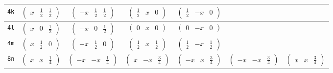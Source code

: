 \documentclass[fleqn,9pt,landscape]{jsarticle}
\begin{document}
\begin{center}
\begin{longtable}{ccccccc}
{\tt 4k} & $ \begin{pmatrix} x & \frac{1}{2} & \frac{1}{2} \end{pmatrix} $ & $ \begin{pmatrix} - x & \frac{1}{2} & \frac{1}{2} \end{pmatrix} $ & $ \begin{pmatrix} \frac{1}{2} & x & 0 \end{pmatrix} $ & $ \begin{pmatrix} \frac{1}{2} & - x & 0 \end{pmatrix} $ & $  $ & $  $ \\ \hline
{\tt 4l} & $ \begin{pmatrix} x & 0 & \frac{1}{2} \end{pmatrix} $ & $ \begin{pmatrix} - x & 0 & \frac{1}{2} \end{pmatrix} $ & $ \begin{pmatrix} 0 & x & 0 \end{pmatrix} $ & $ \begin{pmatrix} 0 & - x & 0 \end{pmatrix} $ & $  $ & $  $ \\ \hline
{\tt 4m} & $ \begin{pmatrix} x & \frac{1}{2} & 0 \end{pmatrix} $ & $ \begin{pmatrix} - x & \frac{1}{2} & 0 \end{pmatrix} $ & $ \begin{pmatrix} \frac{1}{2} & x & \frac{1}{2} \end{pmatrix} $ & $ \begin{pmatrix} \frac{1}{2} & - x & \frac{1}{2} \end{pmatrix} $ & $  $ & $  $ \\ \hline
{\tt 8n} & $ \begin{pmatrix} x & x & \frac{1}{4} \end{pmatrix} $ & $ \begin{pmatrix} - x & - x & \frac{1}{4} \end{pmatrix} $ & $ \begin{pmatrix} x & - x & \frac{3}{4} \end{pmatrix} $ & $ \begin{pmatrix} - x & x & \frac{3}{4} \end{pmatrix} $ & $ \begin{pmatrix} - x & - x & \frac{3}{4} \end{pmatrix} $ & $ \begin{pmatrix} x & x & \frac{3}{4} \end{pmatrix} $ \\

\end{longtable}
\end{center}
\end{document}
